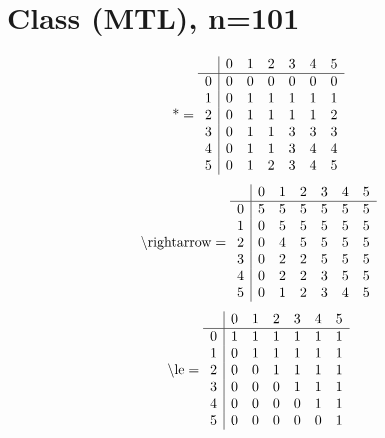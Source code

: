 \documentclass[11pt]{article}
\begin{document}
\section{Class (MTL), n=101}
\[\text{*} = 
\begin{array}{r | r r r r r r}
 & 0 & 1 & 2 & 3 & 4 & 5 \\ \hline
0 & 0 & 0 & 0 & 0 & 0 & 0 \\
1 & 0 & 1 & 1 & 1 & 1 & 1 \\
2 & 0 & 1 & 1 & 1 & 1 & 2 \\
3 & 0 & 1 & 1 & 3 & 3 & 3 \\
4 & 0 & 1 & 1 & 3 & 4 & 4 \\
5 & 0 & 1 & 2 & 3 & 4 & 5 \\
\end{array}
\]
\[\text{\textbackslash rightarrow} = 
\begin{array}{r | r r r r r r}
 & 0 & 1 & 2 & 3 & 4 & 5 \\ \hline
0 & 5 & 5 & 5 & 5 & 5 & 5 \\
1 & 0 & 5 & 5 & 5 & 5 & 5 \\
2 & 0 & 4 & 5 & 5 & 5 & 5 \\
3 & 0 & 2 & 2 & 5 & 5 & 5 \\
4 & 0 & 2 & 2 & 3 & 5 & 5 \\
5 & 0 & 1 & 2 & 3 & 4 & 5 \\
\end{array}
\]
\[\text{\textbackslash le} = 
\begin{array}{r | r r r r r r}
 & 0 & 1 & 2 & 3 & 4 & 5 \\ \hline
0 & 1 & 1 & 1 & 1 & 1 & 1 \\
1 & 0 & 1 & 1 & 1 & 1 & 1 \\
2 & 0 & 0 & 1 & 1 & 1 & 1 \\
3 & 0 & 0 & 0 & 1 & 1 & 1 \\
4 & 0 & 0 & 0 & 0 & 1 & 1 \\
5 & 0 & 0 & 0 & 0 & 0 & 1 \\
\end{array}
\]
\end{document}
